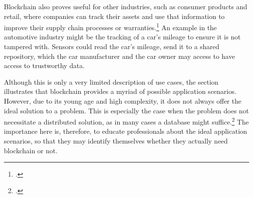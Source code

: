 
Blockchain also proves useful for other industries, such as consumer products and retail, where companies can track their assets and use that information to improve their supply chain processes or warranties.\footcite[Cf.][p.31]{GOV.2016} An example in the automotive industry might be the tracking of a car's mileage to ensure it is not tampered with. Sensors could read the car's mileage, send it to a shared repository, which the car manufacturer and the car owner may access to have access to trustworthy data. %

Although this is only a very limited description of use cases, the section illustrates that blockchain provides a myriad of possible application scenarios. However, due to its young age and high complexity, it does not always offer the ideal solution to a problem. This is especially the case when the problem does not necessitate a distributed solution, as in many cases a database might suffice.\footcites[Cf.][P152, P154]{BerndKammholz_Interview}[cf.][P23]{DanielKaltenbach_Interview} The importance here is, therefore, to educate professionals about the ideal application scenarios, so that they may identify themselves whether they actually need blockchain or not.
